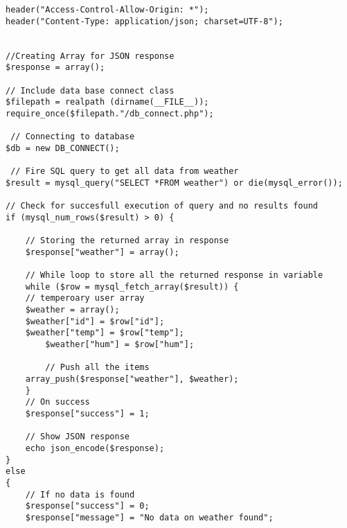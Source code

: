 \documentclass[a4paper,oneside]{article}
\begin{document}
\begin{enumerate}
\begin{itemize}
\begin{verbatim}
header("Access-Control-Allow-Origin: *");
header("Content-Type: application/json; charset=UTF-8");


//Creating Array for JSON response
$response = array();

// Include data base connect class
$filepath = realpath (dirname(__FILE__));
require_once($filepath."/db_connect.php");

 // Connecting to database 
$db = new DB_CONNECT();	

 // Fire SQL query to get all data from weather
$result = mysql_query("SELECT *FROM weather") or die(mysql_error());

// Check for succesfull execution of query and no results found
if (mysql_num_rows($result) > 0) {

	// Storing the returned array in response
    $response["weather"] = array();

	// While loop to store all the returned response in variable
    while ($row = mysql_fetch_array($result)) {
	// temperoary user array
	$weather = array();
	$weather["id"] = $row["id"];
	$weather["temp"] = $row["temp"];
		$weather["hum"] = $row["hum"];

		// Push all the items 
	array_push($response["weather"], $weather);
    }
    // On success
    $response["success"] = 1;

    // Show JSON response
    echo json_encode($response);
}	
else 
{
    // If no data is found
	$response["success"] = 0;
    $response["message"] = "No data on weather found";


\end{verbatim}
\end{itemize}
\end{enumerate}
\end{document}
